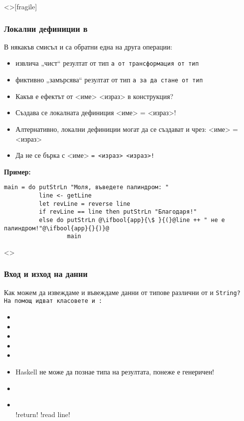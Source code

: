 \documentclass[alsotrans,beameroptions={aspectratio=169}]{beamerswitch}
\begin{document}
\begin{frame}<>[fragile]
  \frametitle{Локални дефиниции в }
  \small
  В някакъв смисъл \lst{<-} и  са обратни една на друга операции:
  \begin{itemize}[<+->]
  \item \lst{<-} извлича „чист“ резултат от тип \tt{a} от трансформация от тип 
  \item {} фиктивно „замърсява“ резултат от тип \tt{a} за да стане от тип 
  \item Какъв е ефектът от <име>  <израз> в  конструкция?
  \item Създава се локалната дефиниция <име> = <израз>!
  \item Алтернативно, локални дефиниции могат да се създават и чрез:  <име> \tta= <израз>
  \item Да не се бърка с  <име> \tt= <израз>  <израз>!
  \end{itemize}
  \onslide<+->
  \textbf{Пример:}
  \vspace{-.5ex}
  \lstfootnotesize
\begin{lstlisting}
main = do putStrLn "Моля, въведете палиндром: "
          line <- getLine
          let revLine = reverse line
          if revLine == line then putStrLn "Благодаря!"
          else do putStrLn @\ifbool{app}{\$ }{(}@line ++ " не е палиндром!"@\ifbool{app}{}{)}@
                  main
\end{lstlisting}
\end{frame}

\begin{frame}<>
  \frametitle{Вход и изход на данни}

  Как можем да извеждаме и въвеждаме данни от типове различни от  и \tt{String}?\\[2ex]
  \pause
  На помощ идват класовете  и :
  \begin{itemize}[<+->]
  \item {}
  \item {}
  \item {}
  \item {}
  \item {}
  \item Haskell не може да познае типа на резултата, понеже е генеричен!
  \item {}
  \item {}\\
    \hspace{7em}\lst!return! \lst!read line!
  \end{itemize}
\end{frame}
\end{document}
